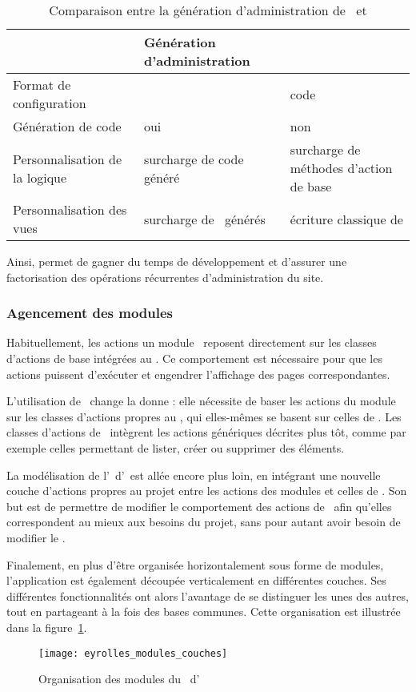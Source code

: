 \begin{table}
	\centering
	\begin{tabular}{|p{3cm}||p{4.5cm}|p{4.5cm}|}
		\hline
		& Génération d'administration & \asladmin\ \tabularnewline
		\hline
		\hline
		Format de configuration & \ayml & code \aphp \tabularnewline
		\hline
		Génération de code & oui & non \tabularnewline
		\hline
		Personnalisation de la logique & surcharge de code généré & surcharge de méthodes d'action de base \tabularnewline
		\hline
		Personnalisation des vues & surcharge de \apartials\ générés & écriture classique de \atemplates \tabularnewline
		\hline
	\end{tabular}
	\caption{Comparaison entre la génération d'administration de \asf\ et \asladmin}
	\label{table:eyrolles_sladmin_sladmin-vs-admin-gen}
\end{table}

Ainsi, \asladmin permet de gagner du temps de développement et d'assurer une factorisation des opérations récurrentes d'administration du site.


\subsubsection{Agencement des modules}

Habituellement, les actions un module \asf\ reposent directement sur les classes d'actions de base intégrées au \afm. Ce comportement est nécessaire pour que les actions puissent d'exécuter et engendrer l'affichage des pages correspondantes.

L'utilisation de \asladmin\ change la donne : elle nécessite de baser les actions du module sur les classes d'actions propres au \aplugin, qui elles-mêmes se basent sur celles de \asf. Les classes d'actions de \asladmin\ intègrent les actions génériques décrites plus tôt, comme par exemple celles permettant de lister, créer ou supprimer des éléments.

La modélisation de l'\aintranet\ d'\aey\ est allée encore plus loin, en intégrant une nouvelle couche d'actions propres au projet entre les actions des modules et celles de \asladmin. Son but est de permettre de modifier le comportement des actions de \asladmin\ afin qu'elles correspondent au mieux aux besoins du projet, sans pour autant avoir besoin de modifier le \aplugin.

Finalement, en plus d'être organisée horizontalement sous forme de modules, l'application est également découpée verticalement en différentes couches. Ses différentes fonctionnalités ont alors l'avantage de se distinguer les unes des autres, tout en partageant à la fois des bases communes. Cette organisation est illustrée dans la figure~\ref{figure:eyrolles_modules_couches}.

\begin{figure}
	\centering
	\texttt{[image: eyrolles\_modules\_couches]}
	\caption{Organisation des modules du \alotdeux\ d'\aey}
	\label{figure:eyrolles_modules_couches}
\end{figure}